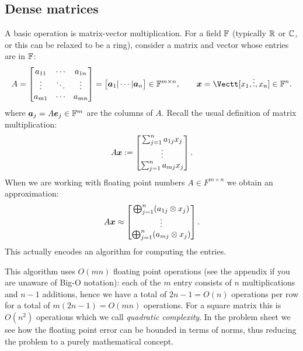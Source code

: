 \subsection{Dense matrices}
A basic operation is matrix-vector multiplication. For a field ${\mathbb F}$ (typically ${\mathbb R}$ or ${\mathbb C}$, or this can be relaxed to be a ring), consider a matrix and vector whose entries are in ${\mathbb F}$:
\[
A = \begin{bmatrix}
a_{11} & \ensuremath{\cdots} & a_{1n} \\
\ensuremath{\vdots} & \ensuremath{\ddots} & \ensuremath{\vdots} \\
a_{m1} & \ensuremath{\cdots} & a_{mn}
\end{bmatrix} = \begin{bmatrix} \ensuremath{\bm{\a}}_1 | \ensuremath{\cdots} | \ensuremath{\bm{\a}}_n \end{bmatrix} \ensuremath{\in} \ensuremath{\bbF}^{m \ensuremath{\times} n}, \qquad
\ensuremath{\bm{\x}} = \Vectt[x_1,\ensuremath{\vdots},x_n] \ensuremath{\in} \ensuremath{\bbF}^n.
\]
where $\bm{{\mbox{\boldmath$a$\unboldmath}}}_j = A \bm{{\mbox{\boldmath$e$\unboldmath}}}_j \in {\mathbb F}^m$ are the columns of $A$. Recall the usual definition of matrix multiplication:
\[
A\bm{{\mbox{\boldmath$x$\unboldmath}}} := \begin{bmatrix} \sum_{j=1}^n a_{1j} x_j \\ \vdots \\ \sum_{j=1}^n a_{mj} x_j \end{bmatrix}.
\]
When we are working with floating point numbers $A \ensuremath{\in} F^{m \ensuremath{\times} n}$ we obtain an approximation:
\[
A\bm{{\mbox{\boldmath$x$\unboldmath}}} \approx \begin{bmatrix} \bigoplus_{j=1}^n (a_{1j}  \otimes x_j) \\ \vdots \\  \bigoplus_{j=1}^n (a_{mj}  \otimes x_j) \end{bmatrix}.
\]
This actually encodes an algorithm for computing the entries.

This algorithm uses $O(m n)$ floating point operations (see the appendix if you are unaware of Big-O notation): each of the $m$ entry consists of $n$ multiplications and $n-1$ additions, hence we have a total of $2n-1 = O(n)$ operations per row for a total of $m(2n-1) = O(mn)$ operations. For a square matrix this is $O(n^2)$ operations which we call \emph{quadratic complexity}. In the problem sheet we see how the floating point error can be bounded in terms of norms, thus reducing the problem to a purely mathematical concept.

